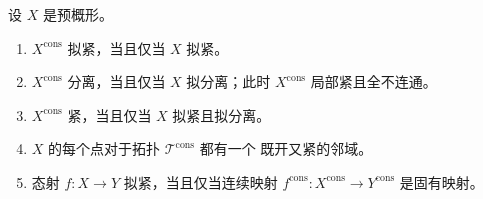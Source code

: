\begin{proposition}[1.9.15]
\label{IV.1.9.15-fr}
设 $X$ 是预概形。
\begin{enumerate}
  \item[(i)] $X^{\mathrm{cons}}$ 拟紧，当且仅当 $X$ 拟紧。
  \item[(ii)] $X^{\mathrm{cons}}$ 分离，当且仅当 $X$ 拟分离；此时
  $X^{\mathrm{cons}}$ 局部紧且全不连通。
  \item[(iii)] $X^{\mathrm{cons}}$ 紧，当且仅当 $X$ 拟紧且拟分离。
  \item[(iv)] $X$ 的每个点对于拓扑 $\mathscr T^{\mathrm{cons}}$ 都有一个
  既开又紧的邻域。
  \item[(v)] 态射 $f:X\to Y$ 拟紧，当且仅当连续映射
  $f^{\mathrm{cons}}:X^{\mathrm{cons}}\to Y^{\mathrm{cons}}$ 是固有映射。
\end{enumerate}
\end{proposition}

